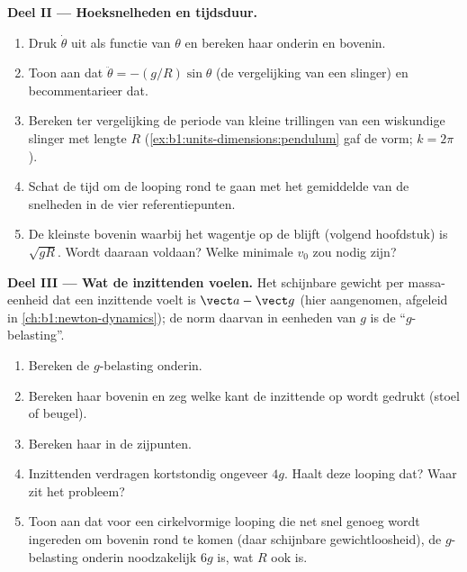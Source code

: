 \begin{problem}
\medskip
\noindent\textbf{Deel II --- Hoeksnelheden en tijdsduur.}
\begin{enumerate}[resume]
  \item Druk $\dot\theta$ uit als functie van $\theta$ en bereken haar
        onderin en bovenin.
  \item Toon aan dat $\ddot\theta = -(g/R)\sin\theta$ (de vergelijking van een
        slinger) en becommentarieer dat.
  \item Bereken ter vergelijking de periode van kleine trillingen van een
        wiskundige slinger met lengte $R$ (\cref{ex:b1:units-dimensions:pendulum}
        gaf de vorm; $k = 2\pi$).
  \item Schat de tijd om de looping rond te gaan met het gemiddelde van
        de snelheden in de vier referentiepunten.
  \item De kleinste  bovenin waarbij het wagentje op de  blijft
        (volgend hoofdstuk) is $\sqrt{gR}$. Wordt daaraan voldaan? Welke minimale
        $v_0$ zou nodig zijn?
\end{enumerate}

\medskip
\noindent\textbf{Deel III --- Wat de inzittenden voelen.}
Het schijnbare gewicht per massa-eenheid dat een inzittende voelt is $\vect a - \vect g$
(hier aangenomen, afgeleid in \cref{ch:b1:newton-dynamics}); de norm daarvan in
eenheden van $g$ is de ``$g$-belasting''.
\begin{enumerate}[resume]
  \item Bereken de $g$-belasting onderin.
  \item Bereken haar bovenin en zeg welke kant de inzittende op wordt
        gedrukt (stoel of beugel).
  \item Bereken haar in de zijpunten.
  \item Inzittenden verdragen kortstondig ongeveer $4g$. Haalt deze looping dat? Waar
        zit het probleem?
  \item Toon aan dat voor een cirkelvormige looping die net snel genoeg wordt ingereden
        om bovenin rond te komen (daar schijnbare gewichtloosheid), de $g$-belasting
        onderin noodzakelijk $6g$ is, wat $R$ ook is.
\end{enumerate}


\end{problem}
